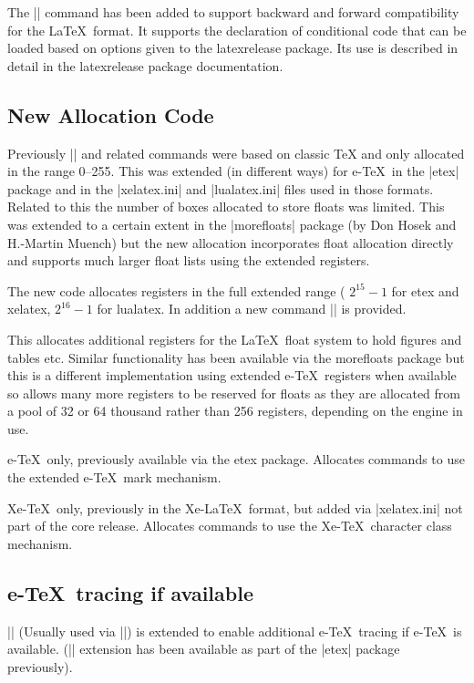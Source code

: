 \documentclass{ltxguide}
\newcommand\Lpack[1]{\mbox{\textsf{#1}}}
\newcommand\DescribeMacro[1]{\texttt{\string#1}}
\begin{document}
\smallskip

The || command has been added to support backward and
forward compatibility for the \LaTeX\ format. It supports the
declaration of conditional code that can be loaded based on options
given to the \Lpack{latexrelease} package. Its use is described in
detail in the \Lpack{latexrelease} package documentation.

\subsection{New Allocation Code\label{e@alloc}}
Previously |\newcount| and related commands were based on classic TeX
and only allocated in the range 0--255. This was extended (in
different ways) for e-\TeX\ in the |etex| package and in the
|xelatex.ini| and |lualatex.ini| files used in those formats. Related
to this the number of boxes allocated to store floats was
limited. This was extended to a certain extent in the |morefloats|
package (by Don Hosek and H.-Martin Muench) but the new allocation
incorporates float allocation directly and supports much larger float
lists using the extended registers.

The new code allocates registers in the full extended range (
$2^{15}-1$ for etex and xelatex, $2^{16}-1$ for lualatex.
In addition a new command |\extrafloats| is provided.

\DescribeMacro{\extrafloats}
\smallskip

This allocates additional registers for the \LaTeX\ float system to
hold figures and tables etc. Similar functionality has been
available via the \Lpack{morefloats} package but this is a different
implementation using extended e-\TeX\ registers when available so
allows many more registers to be reserved for floats as they are
allocated from a pool of 32 or 64 thousand rather than 256 registers,
depending on the engine in use.

\DescribeMacro{\newmarks}
\smallskip

e-\TeX\ only, previously available via the \Lpack{etex} package.
Allocates commands to use the extended  e-\TeX\ mark mechanism.

\DescribeMacro{\newXeTeXintercharclass}
\smallskip

Xe-\TeX\ only, previously in the Xe-\LaTeX\ format, but added via
|xelatex.ini| not part of the core release.
Allocates commands to use the Xe-\TeX\ character class mechanism.


\subsection{e-\TeX\ tracing if available}
|\loggingall| (Usually used via |\tracingall|) is extended to enable
additional e-\TeX\ tracing if e-\TeX\ is available. (|\tracingall|
extension has been available as part of the |etex| package previously).
\end{document}
